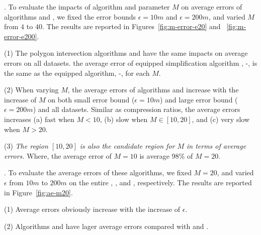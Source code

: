 .
To evaluate the impacts of algorithm \rpia and parameter $M$ on average errors of algorithms \cist and \cista, we fixed the error bounds {$\epsilon =10m$} and $\epsilon =200m$, and varied $M$ from $4$ to $40$.
The results are reported in Figures~\ref{fig:m-error-e20} and ~\ref{fig:m-error-e200}.


\ni(1) The polygon intersection algorithms \rpia and \cpia have the same impacts on average errors on all datasets. \eg the average error of \rpia equipped simplification algorithm \cist, \ie \cist-\rpia, is the same as the \cpia equipped algorithm, \ie \cist-\cpia, for each $M$.


\ni(2) When varying $M$, the average errors of algorithms \cist and \cista increase with the increase of $M$ on both small error bound {(\eg $\epsilon = 10m$)} and large error bound (\eg $\epsilon = 200m$) and all datasets.
Similar as compression ratios, the average errors increases (a) fast when $M < 10$, (b) slow when $M \in [10, 20]$, and (c) very slow when $M  > 20$.


\ni(3) \emph{The region $[10, 20]$ is also the candidate region for $M$ in terms of average errors.}
Where, the average error of $M=10$ is average \textcolor[rgb]{1.00,0.00,0.00}{$98\%$} of $M=20$.




.
To evaluate the average errors of these algorithms, we fixed $M=20$, and varied $\epsilon$ from $10m$ to $200m$ on the entire \truck, \sercar, \geolife and \pricar, respectively.
The results are reported in Figure~\ref{fig:ae-m20}. %

\ni(1) Average errors obviously increase with the increase of $\epsilon$.

\ni(2) Algorithms \cist and \cista have lager average errors compared with \dpa and \squishe.







